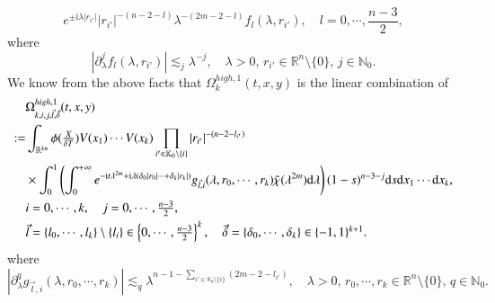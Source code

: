 \documentclass[11pt,reqno]{amsart}
\def\d{{\rm d}}
\numberwithin{equation}{section}
\theoremstyle{definition}
\begin{document}
\begin{equation*}\label{R0term1}
	e^{\pm\mathrm{i}\lambda|r_{i'}|}|r_{i'}|^{-(n-2-l)}\lambda^{-(2m-2-l)}f_l(\lambda,r_{i'}),\quad\mbox{$l=0,\cdots,\frac{n-3}{2}$},
\end{equation*}
where
\begin{equation*}\label{R0term2}
	|\partial_\lambda^j f_l(\lambda,r_{i'})|\lesssim_j\lambda^{-j},\quad\lambda>0,\,r_{i'}\in\mathbb{R}^n\setminus\{0\},\,j\in\mathbb{N}_0.
\end{equation*}
We know from the above facts that $\Omega_k^{high,1}(t,x,y)$ is the linear combination of
\begin{equation}\label{Omegak1i}
	\begin{split}
		&\Omega_{k,i,j,\vec{l},\vec{\delta}}^{high,1}(t,x,y)\\
		:=&\int_{\mathbb{R}^{kn}}\phi(\mbox{$\frac{X}{\delta T}$})V(x_1)\cdots V(x_k)\prod\limits_{i'\in\mathbb{K}_0\setminus\{i\}}|r_{i'}|^{-(n-2-l_{i'})}\\
		&\times\int_0^1\left(\int_0^{+\infty}e^{-\mathrm{i}t\lambda^{2m}+\mathrm{i}\lambda(\delta_0|r_0|\cdots+\delta_k|r_k|)}g_{\vec{l},i}(\lambda,r_0,\cdots,r_k)\tilde{\chi}(\lambda^{2m})\d\lambda\right)(1-s)^{n-3-j}\d s\d x_1\cdots\d x_k,\\
		&\mbox{$i=0,\cdots,k,\quad j=0,\cdots,\frac{n-3}{2},$}\\
		&\mbox{$\vec{l}=\{l_0,\cdots,l_k\}\setminus\{l_i\}\in\left\{0,\cdots,\frac{n-3}{2}\right\}^k,\quad\vec{\delta}=\{\delta_0,\cdots,\delta_k\}\in\{-1,1\}^{k+1}.$}
	\end{split}
\end{equation}	
where
\begin{equation*}
	\left|\partial_\lambda^qg_{\vec{l},i}(\lambda,r_0,\cdots,r_k)\right|\lesssim_q\lambda^{n-1-\sum_{i'\in\mathbb{K}_0\setminus\{i\}}(2m-2-l_{i'})},\quad\lambda>0,\,r_0,\cdots,r_k\in\mathbb{R}^n\setminus\{0\},\,q\in\mathbb{N}_0.
\end{equation*}
\end{document}
